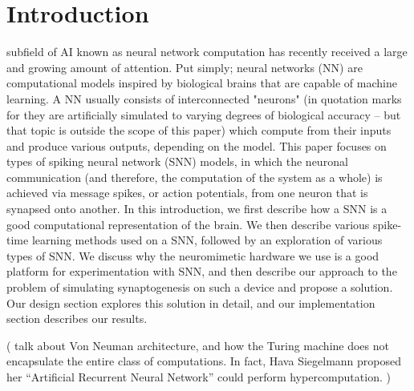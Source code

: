 \documentclass[journal]{./sty/IEEEtran}
\begin{document}
\section{Introduction}
 subfield of AI known as neural network computation has recently received a large and growing amount of attention. Put simply; neural networks (NN) are computational models inspired by biological brains that are capable of machine learning. A NN usually consists of interconnected "neurons" (in quotation marks for they are artificially simulated to varying degrees of biological accuracy -- but that topic is outside the scope of this paper) which compute from their inputs and produce various outputs, depending on the model. This paper focuses on types of spiking neural network (SNN) models, in which the neuronal communication (and therefore, the computation of the system as a whole) is achieved via message spikes, or action potentials, from one neuron that is synapsed onto another. In this introduction, we first describe how a SNN is a good computational representation of the brain. We then describe various spike-time learning methods used on a SNN, followed by an exploration of various types of SNN. We discuss why the neuromimetic hardware we use is a good platform for experimentation with SNN, and then describe our approach to the problem of simulating synaptogenesis on such a device and propose a solution. Our design section explores this solution in detail, and our implementation section describes our results.

( talk about Von Neuman architecture, and how the Turing machine does not encapsulate the entire class of computations. In fact, Hava Siegelmann proposed her ``Artificial Recurrent Neural Network'' could perform hypercomputation. )
\end{document}
